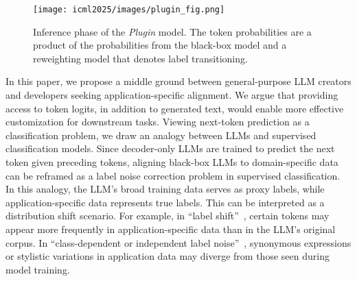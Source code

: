 


\begin{figure}
    \centering
    \texttt{[image: icml2025/images/plugin\_fig.png]}
    \caption{Inference phase of the \textit{Plugin} model. The token probabilities are a product of the probabilities from the black-box model and a reweighting model that denotes label transitioning.}
    \label{fig:plugin_fig}
\end{figure}


In this paper, we propose a middle ground between general-purpose LLM creators and developers seeking application-specific alignment. We argue that providing access to token logits, in addition to generated text, would enable more effective customization for downstream tasks. Viewing next-token prediction as a classification problem, we draw an analogy between LLMs and supervised classification models. Since decoder-only LLMs are trained to predict the next token given preceding tokens, aligning black-box LLMs to domain-specific data can be reframed as a label noise correction problem in supervised classification. In this analogy, the LLM’s broad training data serves as proxy labels, while application-specific data represents true labels. This can be interpreted as a distribution shift scenario. For example, in ``label shift''~\citep{lipton2018detecting}, certain tokens may appear more frequently in application-specific data than in the LLM’s original corpus. In ``class-dependent or independent label noise''~\citep{patrini2017making}, synonymous expressions or stylistic variations in application data may diverge from those seen during model training.


